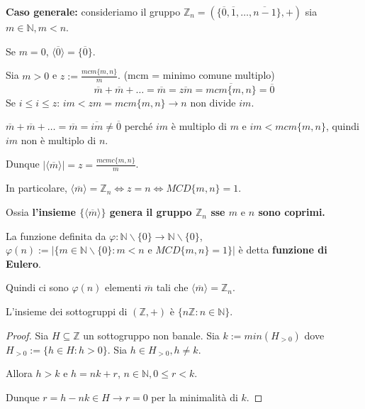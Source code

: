 \documentclass[../main.tex]{subfiles}
\begin{document}
\textbf{Caso generale:} consideriamo il gruppo $\mathbb{Z}_n = (\{\overline{0},\overline{1},\ldots,\overline{n-1}\},+) $ sia $m \in \mathbb{N}, m < n$.

Se $m=0$, $\langle \overline{0} \rangle = \{\overline{0}\}$.

Sia $m > 0 $ e $z := \frac{mcm \{m,n\}}{m}$. (mcm = minimo comune multiplo)
\begin{equation*}
    \overline{m}+\overline{m}+\ldots=\overline{m} = \overline{zm} = \overline{mcm \{m,n\}} = \overline{0}
\end{equation*}
Se $i \leq i \leq z$: $im < zm = mcm \{m,n\} \rightarrow n \text{ non divide } im$.

$\overline{m}+\overline{m}+\ldots=\overline{m} = \overline{im} \neq \overline{0}$ perché $im$ è multiplo di $m$ e $im < mcm \{m,n\}$, quindi $im$ non è multiplo di $n$.

Dunque $|\langle \overline{m} \rangle| = z= \frac{mcmc \{m,n\}}{m}$.

In particolare, $\langle \overline{m} \rangle = \mathbb{Z}_n \iff z=n \iff MCD \{m,n\}=1$.

Ossia \textbf{l'insieme $\{ \langle \overline m \rangle \}$ genera il gruppo $\mathbb{Z}_n$ sse $m \text{ e } n$ sono coprimi.}

\begin{definition}
    La funzione definita da $\varphi : \mathbb{N} \backslash \{0\} \rightarrow \mathbb{N} \backslash \{0\}$, $\varphi(n) := |\{m \in \mathbb{N} \backslash \{0\} : m < n \text{ e } MCD \{m,n\} = 1\}|$ è detta \textbf{funzione di Eulero}.

    Quindi ci sono $\varphi(n)$ elementi $\overline{m}$ tali che $\langle \overline{m} \rangle = \mathbb{Z}_n$.
\end{definition}

\begin{proposition}
    L'insieme dei sottogruppi di $(\mathbb{Z} ,+)$ è $\{n \mathbb{Z} : n \in \mathbb{N} \} $.
\end{proposition}

\begin{proof}
    Sia $H \subseteq \mathbb{Z} $ un sottogruppo non banale. Sia $k := min (H_{>0})$ dove $H_{>0} := \{h \in H : h > 0\}$. Sia $h \in H_{>0}, h \neq k$.

    Allora $h > k$ e $h = nk + r$, $n \in \mathbb{N} , 0 \leq r <k$.

    Dunque $r = h - nk \in H \rightarrow r =0$ per la minimalità di $k$.
\end{proof}
\end{document}
